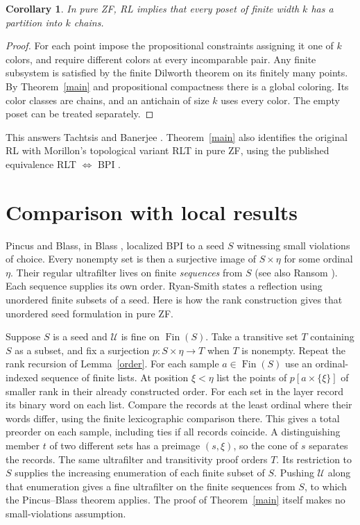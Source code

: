 \documentclass[11pt]{article}
\newtheorem{corollary}[theorem]{Corollary}
\newcommand{\Fin}{\operatorname{Fin}}
\newcommand{\UU}{\mathcal U}
\begin{document}
\begin{corollary}
In pure ZF, RL implies that every poset of finite width $k$ has a partition into $k$ chains.
\end{corollary}
\begin{proof}
For each point impose the propositional constraints assigning it one of $k$ colors, and require different colors at every incomparable pair. Any finite subsystem is satisfied by the finite Dilworth theorem on its finitely many points. By Theorem~\ref{main} and propositional compactness there is a global coloring. Its color classes are chains, and an antichain of size $k$ uses every color. The empty poset can be treated separately.
\end{proof}
This answers Tachtsis \cite[Section~4]{tac} and Banerjee \cite[Question~6.6]{ban}. Theorem~\ref{main} also identifies the original RL with Morillon's topological variant RLT in pure ZF, using the published equivalence RLT $\Leftrightarrow$ BPI \cite{mor,ht}.

\section{Comparison with local results}
Pincus and Blass, in Blass \cite{blass}, localized BPI to a seed $S$ witnessing small violations of choice. Every nonempty set is then a surjective image of $S\times\eta$ for some ordinal $\eta$. Their regular ultrafilter lives on finite \emph{sequences} from $S$ (see also Ransom \cite[Theorem~3.5]{ransom}). Each sequence supplies its own order. Ryan-Smith \cite[Section~3.6]{ryan} states a reflection using unordered finite subsets of a seed. Here is how the rank construction gives that unordered seed formulation in pure ZF.

Suppose $S$ is a seed and $\UU$ is fine on $\Fin(S)$. Take a transitive set $T$ containing $S$ as a subset, and fix a surjection $p:S\times\eta\to T$ when $T$ is nonempty. Repeat the rank recursion of Lemma~\ref{order}. For each sample $a\in\Fin(S)$ use an ordinal-indexed sequence of finite lists. At position $\xi<\eta$ list the points of $p[a\times\{\xi\}]$ of smaller rank in their already constructed order. For each set in the layer record its binary word on each list. Compare the records at the least ordinal where their words differ, using the finite lexicographic comparison there. This gives a total preorder on each sample, including ties if all records coincide. A distinguishing member $t$ of two different sets has a preimage $(s,\xi)$, so the cone of $s$ separates the records. The same ultrafilter and transitivity proof orders $T$. Its restriction to $S$ supplies the increasing enumeration of each finite subset of $S$. Pushing $\UU$ along that enumeration gives a fine ultrafilter on the finite sequences from $S$, to which the Pincus--Blass theorem applies. The proof of Theorem~\ref{main} itself makes no small-violations assumption.
\end{document}
